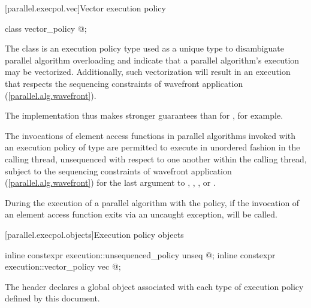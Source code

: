 [parallel.execpol.vec]{Vector execution policy}

\begin{codeblock}
class vector_policy { @\unspec@ };
\end{codeblock}

\pnum
The class  is an execution policy type used as a
unique type to disambiguate parallel algorithm overloading and indicate that a
parallel algorithm's execution may be vectorized. Additionally, such
vectorization will result in an execution that respects the sequencing
constraints of wavefront application
(\ref{parallel.alg.wavefront}).
\begin{note}The implementation thus makes stronger guarantees than for
, for example.\end{note}

\pnum
The invocations of element access functions in parallel algorithms
invoked with an execution policy of type  are permitted to
execute in unordered fashion in the calling thread, unsequenced with respect to
one another within the calling thread, subject to the sequencing constraints of
wavefront application
(\ref{parallel.alg.wavefront})
for the last argument to , ,
, or .

\pnum
During the execution of a parallel algorithm with the
 policy, if the invocation of an
element access function exits via an uncaught exception, 
will be called.

[parallel.execpol.objects]{Execution policy objects}

\begin{codeblock}
inline constexpr execution::unsequenced_policy unseq { @\unspec@ };
inline constexpr execution::vector_policy vec { @\unspec@ };
\end{codeblock}

\pnum
The header  declares a global object
associated with each type of execution policy defined by this document.

